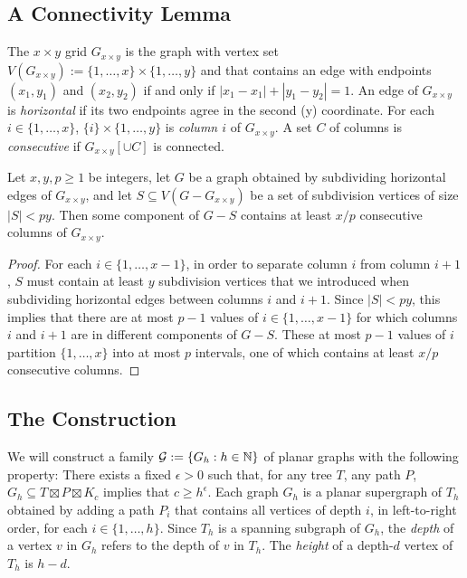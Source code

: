 \documentclass{patmorin}
\newcommand{\defin}[1]{\emph{\color{brightmaroon}#1}}
\begin{document}
\subsection{A Connectivity Lemma}

The $x\times y$ grid $G_{x\times y}$ is the graph with vertex set $V(G_{x\times y}):=\{1,\ldots,x\}\times\{1,\ldots,y\}$ and that contains an edge with endpoints $(x_1,y_1)$ and $(x_2,y_2)$ if and only if $|x_1-x_1|+|y_1-y_2|=1$.  An edge of $G_{x\times y}$ is \defin{horizontal} if its two endpoints agree in the second (y) coordinate.  For each $i\in\{1,\ldots,x\}$, $\{i\}\times\{1,\ldots,y\}$ is \defin{column $i$} of $G_{x\times y}$.  A set $C$ of columns is \defin{consecutive} if $G_{x\times y}[\cup C]$ is connected. 


\begin{lem}\label{grid_connectivity}
  Let $x,y,p\ge 1$ be integers, let $G$ be a graph obtained by subdividing horizontal edges of $G_{x\times y}$, and let $S\subseteq V(G-G_{x\times y})$ be a set of subdivision vertices of size $|S|< py$.  Then some component of $G-S$ contains at least $x/p$ consecutive columns of $G_{x\times y}$.
\end{lem}

\begin{proof}
  For each $i\in\{1,\ldots,x-1\}$, in order to separate column $i$ from column $i+1$, $S$ must contain at least $y$ subdivision vertices that we introduced when subdividing horizontal edges between columns $i$ and $i+1$.  Since $|S|< py$, this implies that there are at most $p-1$ values of $i\in\{1,\ldots,x-1\}$ for which columns $i$ and $i+1$ are in different components of $G-S$. These at most $p-1$ values of $i$ partition $\{1,\ldots,x\}$ into at most $p$ intervals, one of which contains at least $x/p$ consecutive columns.
\end{proof}

\subsection{The Construction}


We will construct a family $\mathcal{G}:=\{G_{h}:h\in\mathbb{N}\}$ of planar graphs with the following property:  There exists a fixed $\epsilon >0$ such that, for any tree $T$, any path $P$, $G_{h}\subseteq T\boxtimes P\boxtimes K_c$ implies that $c\ge h^\epsilon$.  Each graph $G_{h}$ is a planar supergraph of $T_h$ obtained by adding a path $P_i$ that contains all vertices of depth $i$, in left-to-right order, for each $i\in\{1,\ldots,h\}$.   Since $T_h$ is a spanning subgraph of $G_h$, the \defin{depth} of a vertex $v$ in $G_h$ refers to the depth of $v$ in $T_h$.  The \defin{height} of a depth-$d$ vertex of $T_h$ is $h-d$.
\end{document}
